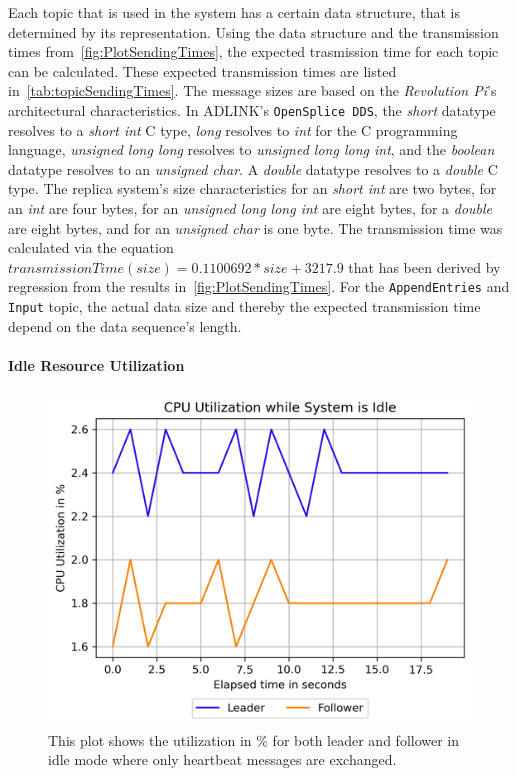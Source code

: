 Each topic that is used in the system has a certain data structure, that is determined by its  representation.
Using the data structure and the transmission times from~\autoref{fig:PlotSendingTimes}, the expected trasmission time for each topic can be calculated.
These expected transmission times are listed in~\autoref{tab:topicSendingTimes}.
The message sizes are based on the \textit{Revolution Pi}'s architectural characteristics.
In ADLINK's \texttt{OpenSplice DDS}, the \textit{short}  datatype resolves to a \textit{short int} C type, \textit{long} resolves to \textit{int} for the C programming language, \textit{unsigned long long} resolves to \textit{unsigned long long int}, and the \textit{boolean} datatype resolves to an \textit{unsigned char}.
A \textit{double}  datatype resolves to a \textit{double} C type.
The replica system's size characteristics for an \textit{short int} are two bytes, for an \textit{int} are four bytes, for an \textit{unsigned long long int} are eight bytes, for a \textit{double} are eight bytes, and for an \textit{unsigned char} is one byte.
The transmission time was calculated via the equation $transmissionTime(size) = 0.1100692 * size + 3217.9$ that has been derived by regression from the results in~\autoref{fig:PlotSendingTimes}.
For the \texttt{AppendEntries} and \texttt{Input} topic, the actual data size and thereby the expected transmission time depend on the data sequence's length. 


\paragraph{Idle Resource Utilization}
\begin{figure}[!hb]
	\centering
	\includegraphics[width=0.75\linewidth]{images/plots/CPUUsageIdleTime}
	\caption{This plot shows the  utilization in \% for both leader and follower in idle mode where only heartbeat messages are exchanged.}
	\label{fig:PlotCPUUsageIdleTime}
\end{figure}

